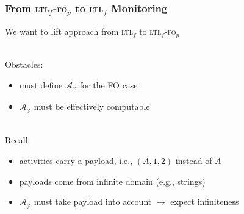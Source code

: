 \documentclass[xcolor=dvipsnames,aspectratio=169]{beamer}
\newcommand{\A}{\mathcal A\xspace}
\newcommand{\ltlf}{\textsc{ltl}$_f$\xspace}
\newcommand{\ltlffop}{\ltlf-\textsc{fo}$_p$\xspace}
\begin{document}
\begin{frame}
\frametitle{From \ltlffop to \ltlf Monitoring}

We want to lift approach from \ltlf to \ltlffop

~\\

Obstacles: 
\begin{itemize}
	\item must define $\A_\varphi$ for the FO case
	\item $\A_\varphi$ must be effectively computable
\end{itemize}

~\\

Recall: 
\begin{itemize}
	\item activities carry a payload, i.e., $(A,1,2)$ instead of $A$
	\item payloads come from infinite domain (e.g., strings)
	\item $\A_\varphi$ must take payload into account ${}\rightarrow{}$ expect infiniteness
\end{itemize}
\end{frame}

\end{document}
